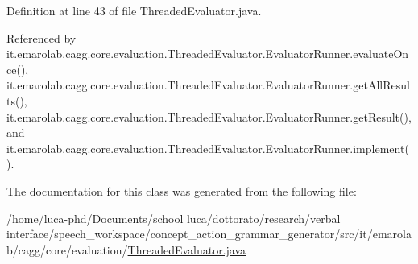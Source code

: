 Definition at line 43 of file Threaded\-Evaluator.\-java.



Referenced by it.\-emarolab.\-cagg.\-core.\-evaluation.\-Threaded\-Evaluator.\-Evaluator\-Runner.\-evaluate\-Once(), it.\-emarolab.\-cagg.\-core.\-evaluation.\-Threaded\-Evaluator.\-Evaluator\-Runner.\-get\-All\-Results(), it.\-emarolab.\-cagg.\-core.\-evaluation.\-Threaded\-Evaluator.\-Evaluator\-Runner.\-get\-Result(), and it.\-emarolab.\-cagg.\-core.\-evaluation.\-Threaded\-Evaluator.\-Evaluator\-Runner.\-implement().



The documentation for this class was generated from the following file\-:\begin{DoxyCompactItemize}
\item 
/home/luca-\/phd/\-Documents/school luca/dottorato/research/verbal interface/speech\-\_\-workspace/concept\-\_\-action\-\_\-grammar\-\_\-generator/src/it/emarolab/cagg/core/evaluation/\hyperlink{ThreadedEvaluator_8java}{Threaded\-Evaluator.\-java}\end{DoxyCompactItemize}
